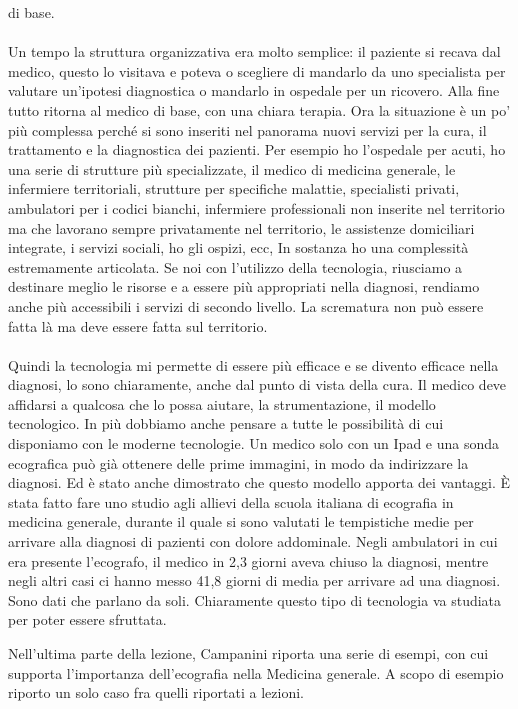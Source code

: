 di base.
\\\\
Un tempo la struttura organizzativa era molto semplice: il paziente si
recava dal medico, questo lo visitava e poteva o scegliere di mandarlo
da uno specialista per valutare un'ipotesi diagnostica o mandarlo in
ospedale per un ricovero. Alla fine tutto ritorna al medico di base, con
una chiara terapia. Ora la situazione è un po' più complessa perché si
sono inseriti nel panorama nuovi servizi per la cura, il trattamento e
la diagnostica dei pazienti. Per esempio ho l'ospedale per acuti, ho una
serie di strutture più specializzate, il medico di medicina generale, le
infermiere territoriali, strutture per specifiche malattie, specialisti
privati, ambulatori per i codici bianchi, infermiere professionali non
inserite nel territorio ma che lavorano sempre privatamente nel
territorio, le assistenze domiciliari integrate, i servizi sociali, ho
gli ospizi, ecc, In sostanza ho una complessità estremamente articolata.
Se noi con l'utilizzo della tecnologia, riusciamo a destinare meglio le
risorse e a essere più appropriati nella diagnosi, rendiamo anche più
accessibili i servizi di secondo livello. La scrematura non può essere
fatta là ma deve essere fatta sul territorio.
\\\\
Quindi la tecnologia mi permette di essere più efficace e se divento
efficace nella diagnosi, lo sono chiaramente, anche dal punto di vista
della cura. Il medico deve affidarsi a qualcosa che lo possa aiutare, la
strumentazione, il modello tecnologico. In più dobbiamo anche pensare a
tutte le possibilità di cui disponiamo con le moderne tecnologie. Un
medico solo con un Ipad e una sonda ecografica può già ottenere delle
prime immagini, in modo da indirizzare la diagnosi. Ed è stato anche
dimostrato che questo modello apporta dei vantaggi. È stata fatto fare
uno studio agli allievi della scuola italiana di ecografia in medicina
generale, durante il quale si sono valutati le tempistiche medie per
arrivare alla diagnosi di pazienti con dolore addominale. Negli
ambulatori in cui era presente l'ecografo, il medico in 2,3 giorni aveva
chiuso la diagnosi, mentre negli altri casi ci hanno messo 41,8 giorni
di media per arrivare ad una diagnosi. Sono dati che parlano da soli.
Chiaramente questo tipo di tecnologia va studiata per poter essere
sfruttata.

Nell'ultima parte della lezione, Campanini riporta una serie di esempi,
con cui supporta l'importanza dell'ecografia nella Medicina generale. A
scopo di esempio riporto un solo caso fra quelli riportati a lezioni.

